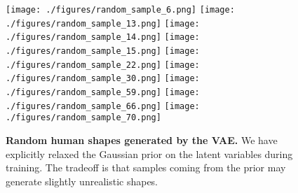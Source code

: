\begin{figure}
\centering
\texttt{[image: ./figures/random\_sample\_6.png]}
\texttt{[image: ./figures/random\_sample\_13.png]}
\texttt{[image: ./figures/random\_sample\_14.png]}
\texttt{[image: ./figures/random\_sample\_15.png]}
\texttt{[image: ./figures/random\_sample\_22.png]}
\texttt{[image: ./figures/random\_sample\_30.png]}
\texttt{[image: ./figures/random\_sample\_59.png]}
\texttt{[image: ./figures/random\_sample\_66.png]}
\texttt{[image: ./figures/random\_sample\_70.png]}

\caption{\textbf{Random human shapes generated by the VAE.} We have explicitly relaxed the Gaussian prior on the latent variables during training. The tradeoff is that samples coming from the prior may generate slightly unrealistic shapes.}
\label{fig:random_sample}
\end{figure} 
%
